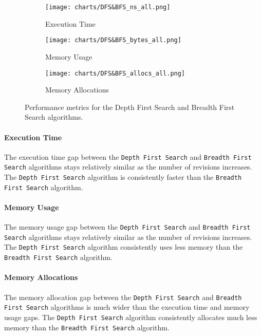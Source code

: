 \begin{figure}[H]
    \centering
    \begin{subfigure}[b]{0.75\textwidth}
        \texttt{[image: charts/DFS\&BFS\_ns\_all.png]}
        \caption{Execution Time}
        \label{fig:depth-first-search-breadth-first-search-execution-time}
    \end{subfigure}

    \begin{subfigure}[b]{0.75\textwidth}
        \texttt{[image: charts/DFS\&BFS\_bytes\_all.png]}
        \caption{Memory Usage}
        \label{fig:depth-first-search-breadth-first-search-memory-usage}
    \end{subfigure}

    \begin{subfigure}[b]{0.75\textwidth}
        \texttt{[image: charts/DFS\&BFS\_allocs\_all.png]}
        \caption{Memory Allocations}
        \label{fig:depth-first-search-breadth-first-search-memory-allocations}
    \end{subfigure}

    \caption{Performance metrics for the Depth First Search and Breadth First Search algorithms.}
    \label{fig:depth-first-search-breadth-first-search-performance-metrics}
\end{figure}

\paragraph{Execution Time}
The execution time gap between the \lstinline{Depth First Search} and \lstinline{Breadth First Search} algorithms stays relatively similar as the number of revisions increases. The \lstinline{Depth First Search} algorithm is consistently faster than the \lstinline{Breadth First Search} algorithm.

\paragraph{Memory Usage}
The memory usage gap between the \lstinline{Depth First Search} and \lstinline{Breadth First Search} algorithms stays relatively similar as the number of revisions increases. The \lstinline{Depth First Search} algorithm consistently uses less memory than the \lstinline{Breadth First Search} algorithm.

\paragraph{Memory Allocations}
The memory allocation gap between the \lstinline{Depth First Search} and \lstinline{Breadth First Search} algorithms is much wider than the execution time and memory usage gaps. The \lstinline{Depth First Search} algorithm consistently allocates much less memory than the \lstinline{Breadth First Search} algorithm.

